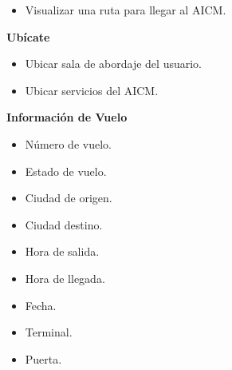 \begin{itemize}
	\item Visualizar una ruta para llegar al AICM.
\end{itemize}

\textbf{Ubícate}

\begin{itemize}
	\item Ubicar sala de abordaje del usuario.
	\item Ubicar servicios del AICM.
\end{itemize} 

\textbf{Información de Vuelo}

\begin{itemize}
	\item Número de vuelo.
	\item Estado de vuelo.
	\item Ciudad de origen.
	\item Ciudad destino.
	\item Hora de salida.
	\item Hora de llegada.
	\item Fecha.
	\item Terminal.
	\item Puerta.
\end{itemize}

